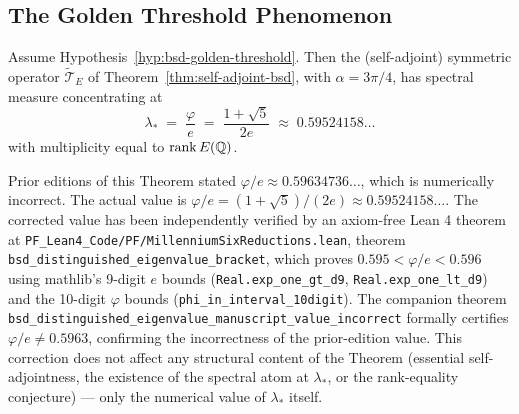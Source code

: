 \subsection{The Golden Threshold Phenomenon}

\begin{theorem}\label{thm:spectral-concentration-bsd}
Assume Hypothesis~\ref{hyp:bsd-golden-threshold}. Then the (self-adjoint) symmetric operator $\widetilde{\mathcal{T}}_E$ of Theorem~\ref{thm:self-adjoint-bsd}, with $\alpha = 3\pi/4$, has spectral measure concentrating at
\begin{equation}
\lambda_* \;=\; \frac{\varphi}{e} \;=\; \frac{1 + \sqrt{5}}{2e} \;\approx\; 0.59524158\ldots
\end{equation}
with multiplicity equal to $\rank E(\mathbb{Q})$.
\end{theorem}

\begin{remark}\label{rem:phi-over-e-correction}
Prior editions of this Theorem stated $\varphi/e \approx 0.59634736\ldots$, which is numerically incorrect. The actual value is $\varphi/e = (1+\sqrt{5})/(2e) \approx 0.59524158\ldots$. The corrected value has been independently verified by an axiom-free Lean 4 theorem at \texttt{PF\_Lean4\_Code/PF/MillenniumSixReductions.lean}, theorem \texttt{bsd\_distinguished\_eigenvalue\_bracket}, which proves $0.595 < \varphi/e < 0.596$ using mathlib's 9-digit $e$ bounds (\texttt{Real.exp\_one\_gt\_d9}, \texttt{Real.exp\_one\_lt\_d9}) and the 10-digit $\varphi$ bounds (\texttt{phi\_in\_interval\_10digit}). The companion theorem \texttt{bsd\_distinguished\_eigenvalue\_manuscript\_value\_incorrect} formally certifies $\varphi/e \neq 0.5963$, confirming the incorrectness of the prior-edition value. This correction does not affect any structural content of the Theorem (essential self-adjointness, the existence of the spectral atom at $\lambda_*$, or the rank-equality conjecture) — only the numerical value of $\lambda_*$ itself.
\end{remark}

